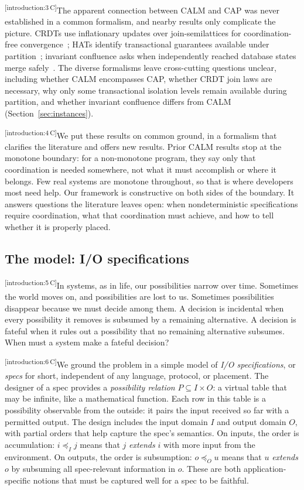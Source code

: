 \documentclass[sigconf]{cidr-2027}
\theoremstyle{remark}
\newcommand{\InputOrd}{\preceq_I}
\newcommand{\OutputOrd}{\preceq_O}
\newcommand{\inrel}{extends\xspace}          %
\newcommand{\outrel}{extends\xspace}          %
\newcommand{\spectype}[1][]{I/O specification#1\xspace}
\newcommand{\Spectype}[1][]{I/O specification#1\xspace}
\newcommand{\cxtag}[2]{\textsuperscript{\textsf{\tiny[#1\,#2]}}}
\begin{document}
\color{black!45}\cxtag{introduction:3}{C}The apparent connection between CALM and CAP was never established in a common
formalism, and nearby results only complicate the picture. CRDTs use
inflationary updates over join-semilattices for coordination-free
convergence~\cite{shapiro2011crdt}; HATs identify transactional guarantees
available under partition~\cite{bailis2013hat}; invariant confluence asks when
independently reached database states merge
safely~\cite{bailis2014coordination}. The diverse formalisms leave cross-cutting
questions unclear, including whether CALM encompasses CAP, whether CRDT join
laws are necessary, why only some transactional isolation levels remain
available during partition, and whether invariant confluence differs from CALM
(Section~\ref{sec:instances}).\color{black}

\color{black!45}\cxtag{introduction:4}{C}We put these results on common ground, in a formalism that clarifies the
literature and offers new results.  Prior CALM results stop at the monotone
boundary: for a non-monotone program, they say only that coordination is needed
somewhere, not what it must accomplish or where it belongs.  Few real systems
are monotone throughout, so that is where developers most need help.  Our
framework is constructive on both sides of the boundary.  It answers questions
the literature leaves open: when nondeterministic specifications require
coordination, what that coordination must achieve, and how to tell whether it is
properly placed.\color{black}

\subsection{The model: \Spectype[s]}
\color{black!45}\cxtag{introduction:5}{C}In systems, as in life, our possibilities narrow over time. Sometimes the world
moves on, and possibilities are lost to us. Sometimes possibilities disappear
because we must decide among them. A decision is incidental when
every possibility it removes is subsumed by a remaining alternative. A
decision is fateful when it rules out a possibility that no remaining alternative subsumes. When must a system make a fateful decision?\color{black}

\color{black!45}\cxtag{introduction:6}{C}We ground the problem in a simple model of \emph{\spectype[s]}, or \emph{specs}
for short, independent of any language, protocol, or placement. The designer of
a spec provides a \emph{possibility relation} $P\subseteq I\times O$: a virtual
table that may be infinite, like a mathematical function. Each row in this table
is a possibility observable from the outside: it pairs the input received so far
with a permitted output. The design includes the input domain $I$ and output domain $O$,
with partial orders that help capture the spec's semantics.  On inputs, the order
is accumulation: $i\InputOrd j$ means that $j$ \emph{\inrel} $i$ with more input
from the environment.  On outputs, the order is subsumption: $o\OutputOrd u$
means that  $u$ \emph{\outrel} $o$ by subsuming all spec-relevant information in
$o$. These are both application-specific notions that must be captured well for
a spec to be faithful.\color{black}
\end{document}
